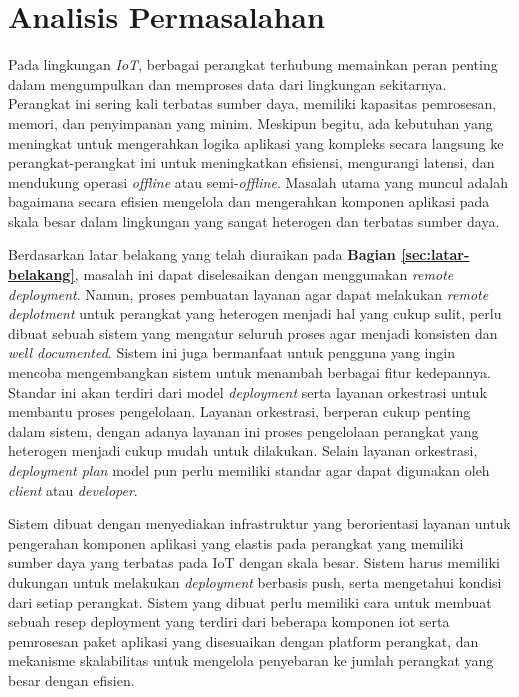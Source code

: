 \section{Analisis Permasalahan}
\label{sec:analisis-permasalahan}

Pada lingkungan \textit{IoT}, berbagai perangkat terhubung memainkan peran penting dalam mengumpulkan dan memproses data dari lingkungan sekitarnya. Perangkat ini sering kali terbatas sumber daya, memiliki kapasitas pemrosesan, memori, dan penyimpanan yang minim. Meskipun begitu, ada kebutuhan yang meningkat untuk mengerahkan logika aplikasi yang kompleks secara langsung ke perangkat-perangkat ini untuk meningkatkan efisiensi, mengurangi latensi, dan mendukung operasi \textit{offline} atau semi-\textit{offline}. Masalah utama yang muncul adalah bagaimana secara efisien mengelola dan mengerahkan komponen aplikasi pada skala besar dalam lingkungan yang sangat heterogen dan terbatas sumber daya.

Berdasarkan latar belakang yang telah diuraikan pada \textbf{Bagian \ref{sec:latar-belakang}}, masalah ini dapat diselesaikan dengan menggunakan \textit{remote deployment}. Namun, proses pembuatan layanan agar dapat melakukan \textit{remote deplotment} untuk perangkat yang heterogen menjadi hal yang cukup sulit, perlu dibuat sebuah sistem yang mengatur seluruh proses agar menjadi konsisten dan \textit{well documented}. Sistem ini juga bermanfaat untuk pengguna yang ingin mencoba mengembangkan sistem untuk menambah berbagai fitur kedepannya. Standar ini akan terdiri dari model \textit{deployment} serta layanan orkestrasi untuk membantu proses pengelolaan. Layanan orkestrasi, berperan cukup penting dalam sistem, dengan adanya layanan ini proses pengelolaan perangkat yang heterogen menjadi cukup mudah untuk dilakukan. Selain layanan orkestrasi, \textit{deployment plan} model pun perlu memiliki standar agar dapat digunakan oleh \textit{client} atau \textit{developer}.

Sistem dibuat dengan menyediakan infrastruktur yang berorientasi layanan untuk pengerahan komponen aplikasi yang elastis pada perangkat yang memiliki sumber daya yang terbatas pada IoT dengan skala besar. Sistem harus memiliki dukungan untuk melakukan \textit{deployment} berbasis push, serta mengetahui kondisi dari setiap perangkat. Sistem yang dibuat perlu memiliki cara untuk membuat sebuah resep deployment yang terdiri dari beberapa komponen iot serta
pemrosesan paket aplikasi yang disesuaikan dengan platform perangkat, dan mekanisme skalabilitas untuk mengelola penyebaran ke jumlah perangkat yang besar dengan efisien.

